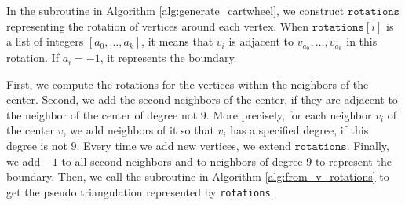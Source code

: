 \documentclass[main.tex]{subfiles}
\begin{document}
In the \generateCartwheel subroutine in Algorithm \ref{alg:generate_cartwheel},
we construct $\texttt{rotations}$ representing the rotation of vertices around each vertex.
When $\texttt{rotations}[i]$ is a list of integers $[a_0, \ldots, a_k]$, it means that $v_i$ is adjacent to $v_{a_0}, \ldots, v_{a_k}$ in this rotation.
If $a_i=-1$, it represents the boundary.

First, we compute the rotations for the vertices within the neighbors of the center.
Second, we add the second neighbors of the center, if they are adjacent to the neighbor of the center of degree not $9$.
More precisely, for each neighbor $v_i$ of the center $v$, we add neighbors of it so that $v_i$ has a specified degree, if this degree is not $9$.
Every time we add new vertices, we extend $\texttt{rotations}$.
Finally, we add $-1$ to all second neighbors and to neighbors of degree $9$ to represent the boundary.
Then, we call the \fromVRotations subroutine in Algorithm \ref{alg:from_v_rotations} to get the pseudo triangulation represented by \texttt{rotations}.
\end{document}
